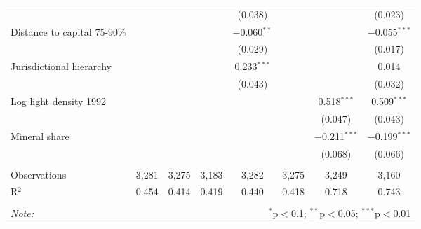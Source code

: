 \begin{table}[!htbp]
\begin{tabular}{@{\extracolsep{2pt}}lccccccc}
  &  &  &  & (0.038) &  &  & (0.023) \\ 
  Distance to capital 75-90\% &  &  &  & $-$0.060$^{**}$ &  &  & $-$0.055$^{***}$ \\ 
  &  &  &  & (0.029) &  &  & (0.017) \\ 
  Jurisdictional hierarchy &  &  &  & 0.233$^{***}$ &  &  & 0.014 \\ 
  &  &  &  & (0.043) &  &  & (0.032) \\ 
  Log light density 1992 &  &  &  &  &  & 0.518$^{***}$ & 0.509$^{***}$ \\ 
  &  &  &  &  &  & (0.047) & (0.043) \\ 
  Mineral share &  &  &  &  &  & $-$0.211$^{***}$ & $-$0.199$^{***}$ \\ 
  &  &  &  &  &  & (0.068) & (0.066) \\ 
 \hline \\[-1.8ex] 
Observations & 3,281 & 3,275 & 3,183 & 3,282 & 3,275 & 3,249 & 3,160 \\ 
R$^{2}$ & 0.454 & 0.414 & 0.419 & 0.440 & 0.418 & 0.718 & 0.743 \\ 
\hline 
\hline \\[-1.8ex] 
\textit{Note:}  & \multicolumn{7}{r}{$^{*}$p$<$0.1; $^{**}$p$<$0.05; $^{***}$p$<$0.01} \\ 
\end{tabular} 
\end{table} 
